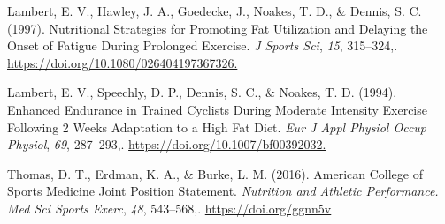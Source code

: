 \documentclass[]{cik}%
\newlength{\cslhangindent}
\newlength{\cslentryspacingunit} %
\newenvironment{CSLReferences}[2] %
 {%
  \setlength{\parindent}{0pt}
  \ifodd #1
  \let\oldpar\par
  \def\par{\hangindent=\cslhangindent\oldpar}
  \fi
  \setlength{\parskip}{#2\cslentryspacingunit}
 }%
 {}
\begin{document}
\begin{CSLReferences}{1}{0}
\leavevmode{}%
Lambert, E. V., Hawley, J. A., Goedecke, J., Noakes, T. D., \& Dennis,
S. C. (1997). Nutritional Strategies for Promoting Fat Utilization and
Delaying the Onset of Fatigue During Prolonged Exercise. \emph{J Sports
Sci}, \emph{15}, 315--324,.
\url{https://doi.org/10.1080/026404197367326.}

\leavevmode{}%
Lambert, E. V., Speechly, D. P., Dennis, S. C., \& Noakes, T. D. (1994).
Enhanced Endurance in Trained Cyclists During Moderate Intensity
Exercise Following 2 Weeks Adaptation to a High Fat Diet. \emph{Eur J
Appl Physiol Occup Physiol}, \emph{69}, 287--293,.
\url{https://doi.org/10.1007/bf00392032.}

\leavevmode{}%
Thomas, D. T., Erdman, K. A., \& Burke, L. M. (2016). American College
of Sports Medicine Joint Position Statement. \emph{Nutrition and
Athletic Performance. Med Sci Sports Exerc}, \emph{48}, 543--568,.
\url{https://doi.org/ggnn5v}

\end{CSLReferences}

%
%

%
%
%
%
\end{document}
